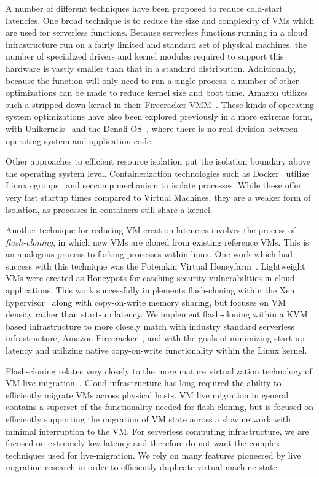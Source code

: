  A number of different techniques have
been proposed to reduce cold-start latencies. One broad technique is to reduce
the size and complexity of VMs which are used for serverless functions. Because
serverless functions running in a cloud infrastructure run on a fairly limited
and standard set of physical machines, the number of specialized drivers and
kernel modules required to support this hardware is vastly smaller than that in
a standard distribution.  Additionally, because the function will only need to
run a single process, a number of other optimizations can be made to reduce
kernel size and boot time. Amazon utilizes such a stripped down kernel in their
Firecracker VMM~\cite{firecracker}. These kinds of operating system
optimizations have also been explored previously in a more extreme form, with
Unikernels~\cite{unikernels} and the Denali OS~\cite{denali}, where there is no
real division between operating system and application code.

Other approaches to efficient resource isolation put the isolation boundary
above the operating system level. Containerization technologies such as
Docker~\cite{docker} utilize Linux cgroups~\cite{cgroups} and seccomp mechanism
to isolate processes. While these offer very fast startup times compared to
Virtual Machines, they are a weaker form of isolation, as processes in
containers still share a kernel.

Another technique for reducing VM creation latencies involves the process of
\emph{flash-cloning}, in which new VMs are cloned from existing reference VMs.
This is an analogous process to forking processes within linux. One work which
had success with this technique was the Potemkin Virtual
Honeyfarm~\cite{potemkin}. Lightweight VMs were created as Honeypots for
catching security vulnerabilities in cloud applications. This work successfully
implements flash-cloning within the Xen hypervisor~\cite{xen} along with
copy-on-write memory sharing, but focuses on VM density rather than start-up
latency. We implement flash-cloning within a KVM based infrastructure to more
closely match with industry standard serverless infrastructure, Amazon
Firecracker~\cite{firecracker}, and with the goals of minimizing start-up
latency and utilizing native copy-on-write functionality within the Linux
kernel.

 Flash-cloning relates very closely to the more
mature virtualization technology of VM live
migration~\cite{post-copy-migration}\cite{snowflock}. Cloud infrastructure has
long required the ability to efficiently migrate VMs across physical hosts. VM
live migration in general contains a superset of the functionality needed for
flash-cloning, but is focused on efficiently supporting the migration of VM
state across a slow network with minimal interruption to the VM. For serverless
computing infrastructure, we are focused on extremely low latency and therefore
do not want the complex techniques used for live-migration. We rely on many
features pioneered by live migration research in order to efficiently duplicate
virtual machine state.
